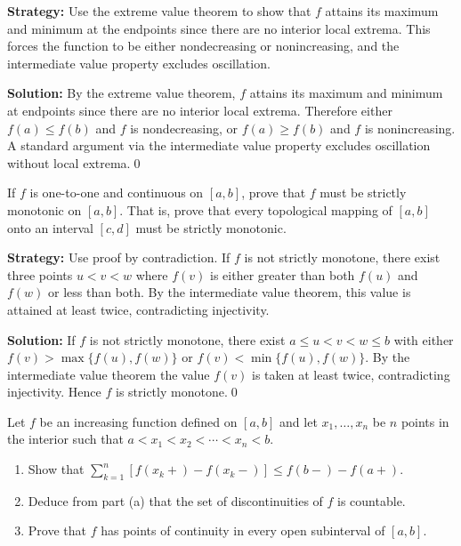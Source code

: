 \noindent\textbf{Strategy:} Use the extreme value theorem to show that $f$ attains its maximum and minimum at the endpoints since there are no interior local extrema. This forces the function to be either nondecreasing or nonincreasing, and the intermediate value property excludes oscillation.

\bigskip\noindent\textbf{Solution:}
By the extreme value theorem, $f$ attains its maximum and minimum at endpoints since there are no interior local extrema. Therefore either $f(a)\le f(b)$ and $f$ is nondecreasing, or $f(a)\ge f(b)$ and $f$ is nonincreasing. A standard argument via the intermediate value property excludes oscillation without local extrema.\qed



\begin{problembox}
If $f$ is one-to-one and continuous on $[a, b]$, prove that $f$ must be strictly monotonic on $[a, b]$. That is, prove that every topological mapping of $[a, b]$ onto an interval $[c, d]$ must be strictly monotonic.
\end{problembox}

\noindent\textbf{Strategy:} Use proof by contradiction. If $f$ is not strictly monotone, there exist three points $u < v < w$ where $f(v)$ is either greater than both $f(u)$ and $f(w)$ or less than both. By the intermediate value theorem, this value is attained at least twice, contradicting injectivity.

\bigskip\noindent\textbf{Solution:}
If $f$ is not strictly monotone, there exist $a\le u<v<w\le b$ with either $f(v)>\max\{f(u),f(w)\}$ or $f(v)<\min\{f(u),f(w)\}$. By the intermediate value theorem the value $f(v)$ is taken at least twice, contradicting injectivity. Hence $f$ is strictly monotone.\qed



\begin{problembox}
Let $f$ be an increasing function defined on $[a, b]$ and let $x_1, \ldots, x_n$ be $n$ points in the interior such that $a < x_1 < x_2 < \cdots < x_n < b$.
\begin{enumerate}[label=(\alph*)]
\item Show that $\sum_{k=1}^n [f(x_k+) - f(x_k-)] \leq f(b-) - f(a+)$.
\item Deduce from part (a) that the set of discontinuities of $f$ is countable.
\item Prove that $f$ has points of continuity in every open subinterval of $[a, b]$.
\end{enumerate}
\end{problembox}

